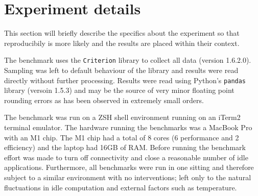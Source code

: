 \section{Experiment details}
This section will briefly describe the specifics about the experiment so that
reproducibily is more likely and the results are placed within their context.

The benchmark uses the \verb|Criterion| library to collect all data (version
1.6.2.0). Sampling was left to default behaviour of the library and results were
read directly without further processing. Results were read using Python's
\verb|pandas| library (versoin 1.5.3) and may be the source of very minor floating point
rounding errors as has been observed in extremely small orders.

The benchmark was run on a ZSH shell environment running on an iTerm2 terminal
emulator. The hardware running the benchmarks was a MacBook Pro with an M1 chip.
The M1 chip had a total of 8 cores (6 performance and 2 efficiency) and the
laptop had 16GB of RAM. Before running the benchmark effort was made to turn off
connectivity and close a reasonable number of idle applications. Furthermore,
all benchmarks were run in one sitting and therefore subject to a similar
environment with no interventions; left only to the natural fluctuations in idle
computation and external factors such as temperature.
